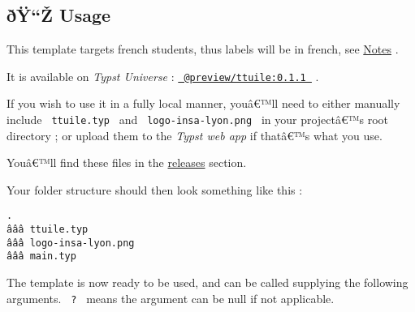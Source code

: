 \subsection{ðŸ``Ž Usage}\label{uxf0uxffux17e-usage}

This template targets french students, thus labels will be in french,
see
\href{https://github.com/typst/packages/raw/main/packages/preview/ttuile/0.1.1/\#-notes}{Notes}
.

It is available on \emph{Typst Universe} :
\href{https://typst.app/universe/package/ttuile}{\texttt{\ @preview/ttuile:0.1.1\ }}
.

If you wish to use it in a fully local manner, youâ€™ll need to either
manually include \texttt{\ ttuile.typ\ } and
\texttt{\ logo-insa-lyon.png\ } in your projectâ€™s root directory ; or
upload them to the \emph{Typst web app} if thatâ€™s what you use.

Youâ€™ll find these files in the
\href{https://github.com/vitto4/ttuile/releases}{releases} section.

Your folder structure should then look something like this :

\begin{verbatim}
.
âââ ttuile.typ
âââ logo-insa-lyon.png
âââ main.typ
\end{verbatim}

The template is now ready to be used, and can be called supplying the
following arguments. \texttt{\ ?\ } means the argument can be null if
not applicable.

